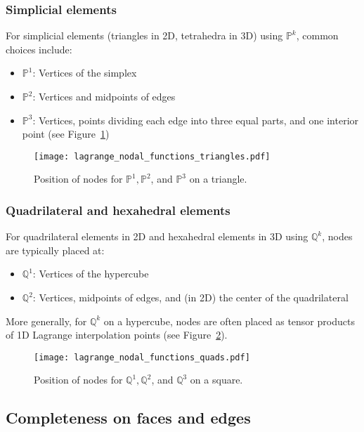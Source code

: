 \subsubsection{Simplicial elements}

For simplicial elements (triangles in 2D, tetrahedra in 3D) using $\mathbb{P}^k$, common choices include:

\begin{itemize}
\item $\mathbb{P}^1$: Vertices of the simplex
\item $\mathbb{P}^2$: Vertices and midpoints of edges
\item $\mathbb{P}^3$: Vertices, points dividing each edge into three equal parts, and one interior point (see Figure~\ref{fig:p_nodes_2d})
\end{itemize}

\begin{figure}[!htb]
\centering
\texttt{[image: lagrange\_nodal\_functions\_triangles.pdf]}
\caption{Position of nodes for $\mathbb{P}^1, \mathbb{P}^2$, and $\mathbb{P}^3$ on a triangle.}
\label{fig:p_nodes_2d}
\end{figure}

\subsubsection{Quadrilateral and hexahedral elements}

For quadrilateral elements in 2D and hexahedral elements in 3D using $\mathbb{Q}^k$, nodes are typically placed at:

\begin{itemize}
\item $\mathbb{Q}^1$: Vertices of the hypercube
\item $\mathbb{Q}^2$: Vertices, midpoints of edges, and (in 2D) the center of the quadrilateral
\end{itemize}

More generally, for $\mathbb{Q}^k$ on a hypercube, nodes are often placed as tensor products of 1D Lagrange interpolation points (see Figure~\ref{fig:q_nodes_2d}).


\begin{figure}[!htb]
  \centering
  \texttt{[image: lagrange\_nodal\_functions\_quads.pdf]}
  \caption{Position of nodes for $\mathbb{Q}^1, \mathbb{Q}^2$, and $\mathbb{Q}^3$ on a square.}
  \label{fig:q_nodes_2d}
  \end{figure}

\subsection{Completeness on faces and edges}

